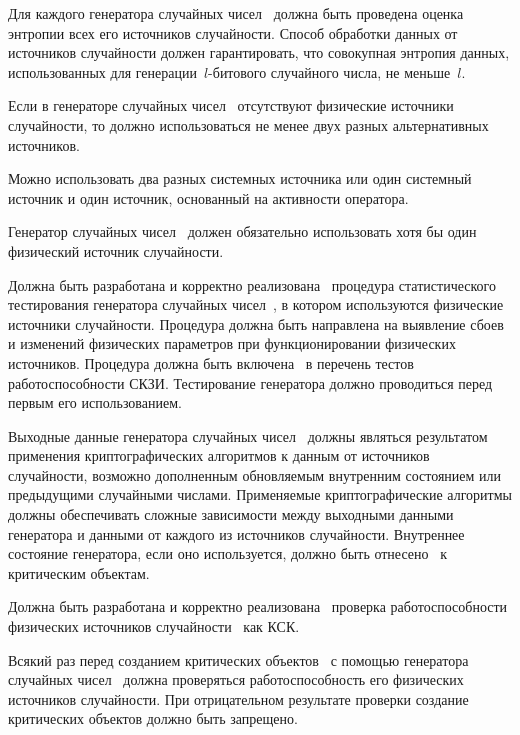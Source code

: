 \label{R.RN.Entropy} %
Для каждого генератора случайных чисел~ должна быть проведена
оценка энтропии всех его источников случайности.
%
Способ обработки данных от источников случайности должен гарантировать, что
совокупная энтропия данных, использованных для генерации~$l$-битового случайного
числа, не меньше~$l$.

\label{R.RN.Source1} %
Если в генераторе случайных чисел~ отсутствуют физические
источники случайности, то должно использоваться не менее двух разных
альтернативных источников.

\begin{note*}
Можно использовать два разных системных источника или один системный источник и
один источник, основанный на активности оператора.
\end{note*}

\label{R.RN.Source2} %
Генератор случайных чисел~ должен обязательно использовать
хотя бы один физический источник случайности.

\label{R.RN.Tests} %
Должна быть разработана и корректно
реализована~ процедура статистического
тестирования генератора случайных чисел~, в котором
используются физические источники случайности.
%
Процедура должна быть направлена на выявление сбоев и изменений физических
параметров при функционировании физических источников.
%
Процедура должна быть включена~ в перечень тестов 
работоспособности СКЗИ. Тестирование генератора должно проводиться перед 
первым его использованием. 

\label{R.RN.Crypto} %
Выходные данные генератора случайных чисел~
должны являться результатом применения криптографических алгоритмов к данным от 
источников случайности, возможно дополненным обновляемым внутренним состоянием
или предыдущими случайными числами.
%
Применяемые криптографические алгоритмы должны обеспечивать сложные зависимости
между выходными данными генератора и данными от каждого из источников
случайности.
%
Внутреннее состояние генератора, если оно используется, должно быть
отнесено~ к критическим объектам.

\label{R.RN.TotTest} %
Должна быть разработана и корректно
реализована~ проверка работоспособности
физических источников случайности~ как КСК.

\label{R.RN.GenCrit} %
Всякий раз перед созданием критических объектов~ с помощью
генератора случайных чисел~ должна проверяться
работоспособность его физических источников случайности.
%
При отрицательном результате проверки создание критических объектов должно быть
запрещено.
